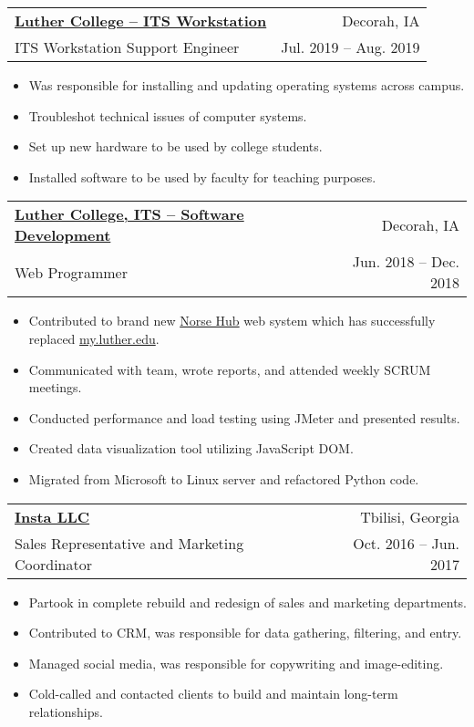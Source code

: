 \documentclass{article}
\makeatletter
\newcommand{\entry}[4]{
    \vspace{-1pt}
    \item
    \begin{tabular*}{0.98\textwidth}[t]{l@{\extracolsep{\fill}}r}
        \textbf{#1} & #2\\
        \small#3 & \small #4\\
    \end{tabular*}\vspace{-4pt}
}
\newcommand{\entryitemsstart}{\begin{itemize}[label=\(\circ\)]}
\newcommand{\entryitemsend}{\end{itemize}\vspace{-4pt}}
\newcommand{\entryitem}[1]{\item\small{#1}}
\makeatother
\begin{document}
\entry{\href{https://www.luther.edu/its/}{Luther College -- ITS Workstation}}{Decorah, IA}{ITS Workstation Support Engineer}{Jul. 2019 -- Aug. 2019}
\entryitemsstart
    \entryitem{Was responsible for installing and updating operating systems across campus.}
    \entryitem{Troubleshot technical issues of computer systems.}
    \entryitem{Set up new hardware to be used by college students.}
    \entryitem{Installed software to be used by faculty for teaching purposes.}
\entryitemsend

\entry{\href{https://www.luther.edu/its/}{Luther College, ITS -- Software Development}}{Decorah, IA}{Web Programmer}{Jun. 2018 -- Dec. 2018}
\entryitemsstart
    \entryitem{Contributed to brand new \href{https://norsehub.luther.edu/}{Norse Hub} web system which has successfully replaced \href{https://my.luther.edu/}{my.luther.edu}.}
    \entryitem{Communicated with team, wrote reports, and attended weekly SCRUM meetings.}
    \entryitem{Conducted performance and load testing using JMeter and presented results.}
    \entryitem{Created data visualization tool utilizing JavaScript DOM.}
    \entryitem{Migrated from Microsoft to Linux server and refactored Python code.}
\entryitemsend

\entry{\href{https://www.insta.ge}{Insta LLC}}{Tbilisi, Georgia}{Sales Representative and Marketing Coordinator}{Oct. 2016 -- Jun. 2017}
\entryitemsstart
    \entryitem{Partook in complete rebuild and redesign of sales and marketing departments.}
    \entryitem{Contributed to CRM, was responsible for data gathering, filtering, and entry.}
    \entryitem{Managed social media, was responsible for copywriting and image-editing.}
    \entryitem{Cold-called and contacted clients to build and maintain long-term relationships.}
\entryitemsend



\end{document}
